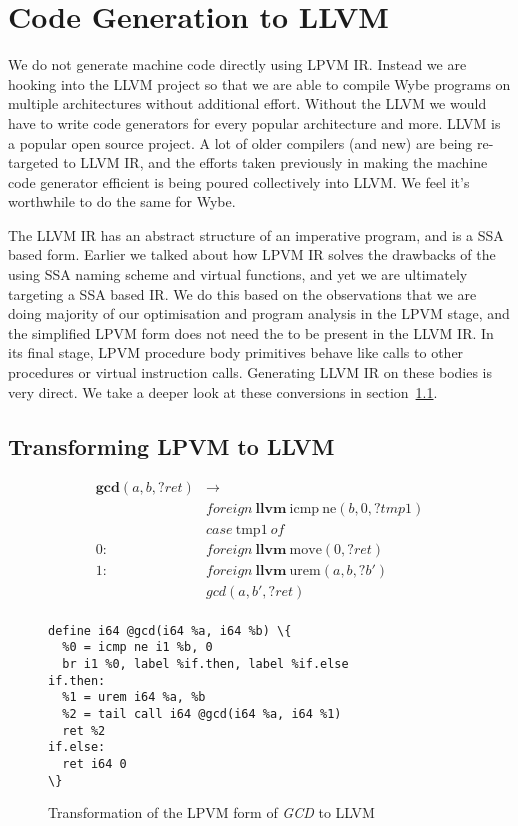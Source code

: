 \chapter{Code Generation to LLVM}
\label{chap:codegen_llvm}

We do not generate machine code directly using LPVM IR. Instead we are hooking
into the LLVM project so that we are able to compile Wybe programs on multiple
architectures without additional effort. Without the LLVM we would have to
write code generators for every popular architecture and more. LLVM is a
popular open source project. A lot of older compilers (and new) are being
re-targeted to LLVM IR, and the efforts taken previously in making the machine
code generator efficient is being poured collectively into LLVM. We feel it's
worthwhile to do the same for Wybe. 

The LLVM IR has an abstract structure of an imperative program, and is a SSA
based form. Earlier we talked about how LPVM IR solves the drawbacks of the
using SSA naming scheme and virtual functions, and yet we are ultimately
targeting a SSA based IR. We do this based on the observations that we are
doing majority of our optimisation and program analysis in the LPVM stage, and
the simplified LPVM form does not need the \phif to be present in the LLVM
IR. In its final stage, LPVM procedure body primitives behave like calls to
other procedures or virtual instruction calls. Generating LLVM IR on these
bodies is very direct. We take a deeper look at these conversions in
section~\ref{sec:lpvm_to_llvm}.




\section{Transforming LPVM to LLVM}
\label{sec:lpvm_to_llvm}

\begin{figure}
    \begin{align*}
      \mathbf{gc}\mathbf{d}(a,b,?ret) & \rightarrow \\
          & foreign\ \mathbf{llvm}\ \mathrm{icmp}\ \mathrm{ne}(b,0,?tmp1) \\
          & case\ \mathrm{tmp1}\ of \\
      0:\ & foreign\ \mathbf{llvm}\ \mathrm{move}(0,?ret) \\
      1:\ & foreign\ \mathbf{llvm}\ \mathrm{urem}(a,b,?b') \\
          &  gcd(a,b',?ret) \\
    \end{align*}
\begin{Verbatim}[frame=lines,label=LLVM,labelposition=topline,
framesep=4mm,fontsize=\small,commandchars=\\\{\}]
define i64 @gcd(i64 %a, i64 %b) \{
  %0 = icmp ne i1 %b, 0 
  br i1 %0, label %if.then, label %if.else
if.then:
  %1 = urem i64 %a, %b
  %2 = tail call i64 @gcd(i64 %a, i64 %1)
  ret %2
if.else:
  ret i64 0
\}
\end{Verbatim}
  \caption{Transformation of the LPVM form of \textit{GCD} to LLVM}
  \label{fig:lpvm_to_llvm}
\end{figure}

